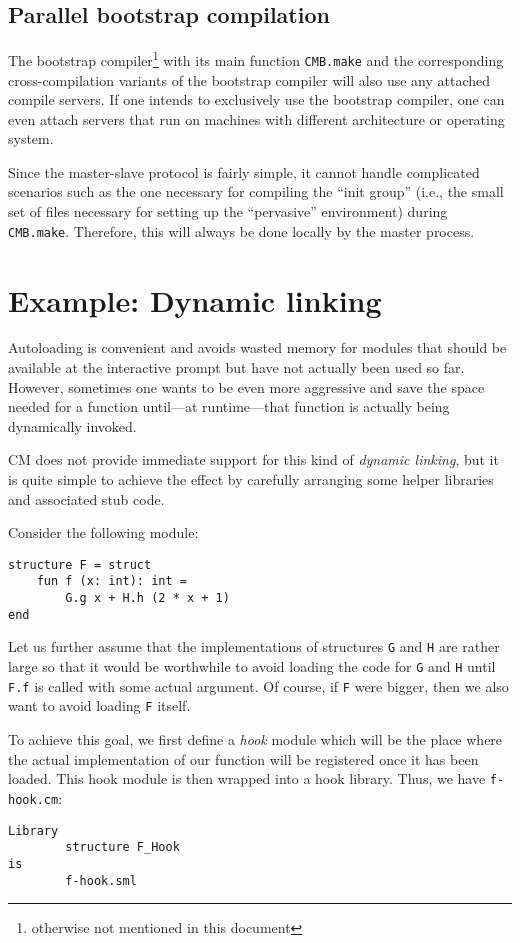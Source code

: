 \documentclass{article}
\begin{document}
\subsection{Parallel bootstrap compilation}

The bootstrap compiler\footnote{otherwise not mentioned in this
document} with its main function {\tt CMB.make} and the corresponding
cross-compilation variants of the bootstrap compiler will also use any
attached compile servers.  If one intends to exclusively use the
bootstrap compiler, one can even attach servers that run on machines
with different architecture or operating system.

Since the master-slave protocol is fairly simple, it cannot handle
complicated scenarios such as the one necessary for compiling the
``init group'' (i.e., the small set of files necessary for setting up
the ``pervasive'' environment) during {\tt CMB.make}.  Therefore, this
will always be done locally by the master process.

\section{Example: Dynamic linking}
\label{sec:dynlink}

Autoloading is convenient and avoids wasted memory for modules that
should be available at the interactive prompt but have not actually
been used so far.  However, sometimes one wants to be even more
aggressive and save the space needed for a function until---at
runtime---that function is actually being dynamically invoked.

CM does not provide immediate support for this kind of {\em dynamic
linking}, but it is quite simple to achieve the effect by carefully
arranging some helper libraries and associated stub code.

Consider the following module:
\begin{verbatim}
structure F = struct
    fun f (x: int): int =
        G.g x + H.h (2 * x + 1)
end
\end{verbatim}

Let us further assume that the implementations of structures {\tt G}
and {\tt H} are rather large so that it would be worthwhile to avoid
loading the code for {\tt G} and {\tt H} until {\tt F.f} is called
with some actual argument.  Of course, if {\tt F} were bigger, then we
also want to avoid loading {\tt F} itself.

To achieve this goal, we first define a {\em hook} module which will
be the place where the actual implementation of our function will be
registered once it has been loaded.  This hook module is then wrapped
into a hook library.  Thus, we have {\tt f-hook.cm}:
\begin{verbatim}
Library
        structure F_Hook
is
        f-hook.sml
\end{verbatim}
\end{document}
